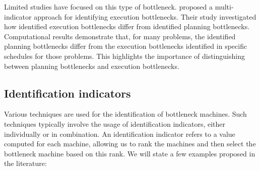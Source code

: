 Limited studies have focused on this type of bottleneck.
\citet{Wang2016} proposed a multi-indicator approach for identifying execution bottlenecks.
Their study investigated how identified execution bottlenecks differ from identified planning bottlenecks.
Computational results demonstrate that, for many problems,
the identified planning bottlenecks differ from the execution bottlenecks identified in specific schedules for those problems.
This highlights the importance of distinguishing between planning bottlenecks and execution bottlenecks.

\subsection{Identification indicators} \label{subsec:related-works/bottlenecks-in-scheduling/identification-indicators}

Various techniques are used for the identification of bottleneck machines.
Such techniques typically involve the usage of identification indicators,
either individually or in combination.
An identification indicator refers to a value computed for each machine,
allowing us to rank the machines and then select the bottleneck machine based on this rank.
We will state a few examples proposed in the literature:

